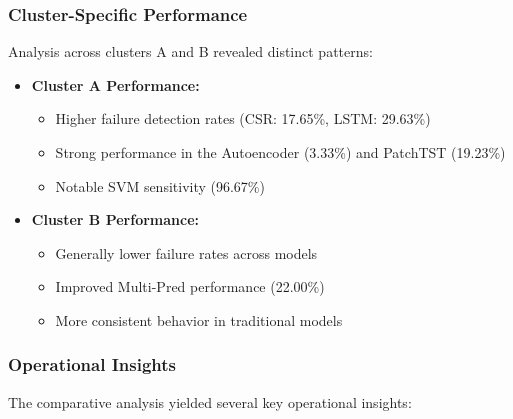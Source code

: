 \documentclass{article}
\begin{document}
\subsubsection{Cluster-Specific Performance}
Analysis across clusters A and B revealed distinct patterns:
\begin{itemize}
    \item \textbf{Cluster A Performance:}
    \begin{itemize}
        \item Higher failure detection rates (CSR: 17.65\%, LSTM: 29.63\%)
        \item Strong performance in the Autoencoder (3.33\%) and PatchTST (19.23\%)
        \item Notable SVM sensitivity (96.67\%)
    \end{itemize}
    
    \item \textbf{Cluster B Performance:}
    \begin{itemize}
        \item Generally lower failure rates across models
        \item Improved Multi-Pred performance (22.00\%)
        \item More consistent behavior in traditional models
    \end{itemize}
\end{itemize}

\subsubsection{Operational Insights}
The comparative analysis yielded several key operational insights:
\end{document}
